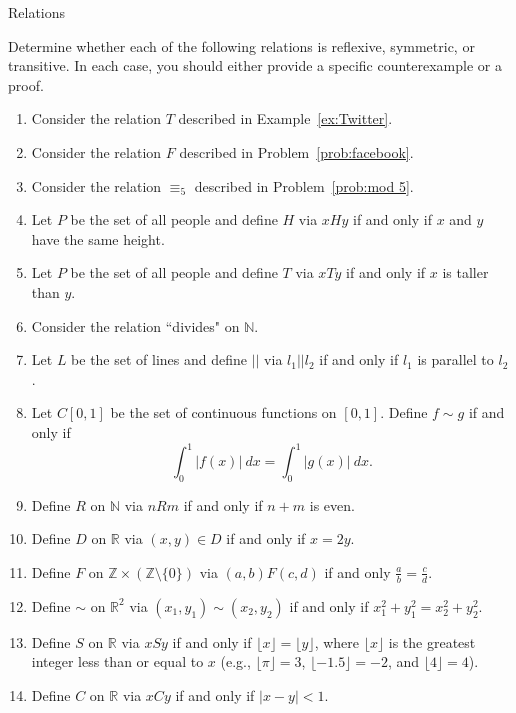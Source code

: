 \begin{section}{Relations}
\begin{problem}\label{prob:lots of relations}
Determine whether each of the following relations is reflexive, symmetric, or transitive. In each case, you should either provide a specific counterexample or a proof.
\begin{enumerate}[label=\textrm{(\alph*)}]
\item Consider the relation $T$ described in Example~\ref{ex:Twitter}.
\item Consider the relation $F$ described in Problem~\ref{prob:facebook}.
\item Consider the relation $\equiv_5$ described in Problem~\ref{prob:mod 5}.
\item Let $P$ be the set of all people and define $H$ via $xHy$ if and only if $x$ and $y$ have the same height.
\item Let $P$ be the set of all people and define $T$ via $xTy$ if and only if $x$ is taller than $y$.
\item Consider the relation ``divides" on $\mathbb{N}$.
\item Let $L$ be the set of lines and define $||$ via $l_1||l_2$ if and only if $l_1$ is parallel to $l_2$.
\item Let $C[0,1]$ be the set of continuous functions on $[0,1]$.  Define $f\sim g$ if and only if
\[
\int_0^1|f(x)|\ dx=\int_0^1|g(x)|\ dx.
\]
\item Define $R$ on $\mathbb{N}$ via $nR m$ if and only if $n+m$ is even.
\item Define $D$ on $\mathbb{R}$ via $(x,y)\in D$ if and only if $x=2y$.
\item Define $F$ on $\mathbb{Z}\times \left(\mathbb{Z}\setminus \{0\}\right)$ via $(a,b)F(c,d)$ if and only $\frac{a}{b}=\frac{c}{d}$.
\item Define $\sim$ on $\mathbb{R}^2$ via $(x_1,y_1)\sim (x_2,y_2)$ if and only if $x_1^2+y_1^2=x_2^2+y_2^2$.
\item Define $S$ on $\mathbb{R}$ via $xS y$ if and only if $\lfloor x\rfloor =\lfloor y\rfloor$, where $\lfloor x\rfloor$ is the greatest integer less than or equal to $x$ (e.g., $\lfloor \pi\rfloor=3$, $\lfloor -1.5\rfloor=-2$, and $\lfloor 4\rfloor=4$).
\item Define $C$ on $\mathbb{R}$ via $xCy$ if and only if $|x-y|<1$.
\end{enumerate}
\end{problem}

\end{section}